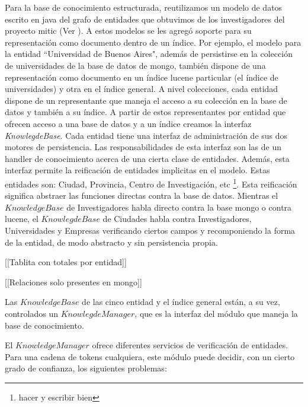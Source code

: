 Para la base de conocimiento estructurada, reutilizamos un modelo de datos
escrito en java  del grafo de entidades que obtuvimos de los investigadores del proyecto mitic (Ver ).
A estos modelos se les agregó soporte para su representación como documento dentro de un índice.
Por ejemplo, el modelo para la entidad ``Universidad de Buenos Aires", además de
persistirse en la colección de universidades de la base de datos de mongo, también dispone de una representación como documento en 
un índice lucene particular (el índice de universidades) y otra en el índice general.
A nivel colecciones, cada entidad dispone de un representante que maneja el acceso a su colección en la base de datos y también a su índice. A partir de estos representantes por entidad que ofrecen acceso a una base de datos y a un índice creamos la interfaz \emph{KnowlegdeBase}. 
Cada entidad tiene una interfaz de administración de sus dos motores de persistencia. Las responsabilidades de esta interfaz son las de un handler de conocimiento acerca de una cierta clase de entidades. 
Además, esta interfaz permite la reificación de entidades implicitas en el modelo. Estas entidades son: Ciudad, Provincia, Centro de Investigación, etc \footnote{hacer y escribir bien}. Esta reificación significa abstraer las funciones directas contra la base de datos. Mientras el $KnowledgeBase$ de Investigadores habla directo contra la base mongo o contra lucene, el $KnowlegdeBase$ de Ciudades habla contra Investigadores, Universidades y Empresas verificando ciertos campos y recomponiendo la forma de la entidad, de modo abstracto y sin persistencia propia. 

[[Tablita con totales por entidad]]

\bigskip

[[Relaciones solo presentes en mongo]]

\bigskip

Las $KnowledgeBase$ de las cinco entidad y el índice general están, a su vez, controlados un $KnowlegdeManager$, que es la interfaz del módulo que maneja la base de conocimiento. 

El $KnowledgeManager$ ofrece diferentes servicios de verificación de entidades. Para una cadena de tokens cualquiera, este módulo puede decidir, con un cierto grado de confianza, los siguientes problemas:

